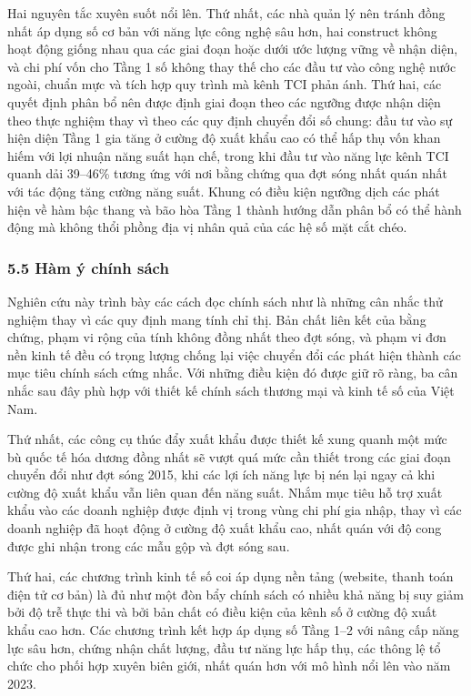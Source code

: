 \documentclass[12pt,a4paper]{article}
\begin{document}
Hai nguyên tắc xuyên suốt nổi lên. Thứ nhất, các nhà quản lý nên tránh
đồng nhất áp dụng số cơ bản với năng lực công nghệ sâu hơn, hai
construct không hoạt động giống nhau qua các giai đoạn hoặc dưới ước
lượng vững về nhận diện, và chi phí vốn cho Tầng 1 số không thay thế cho
các đầu tư vào công nghệ nước ngoài, chuẩn mực và tích hợp quy trình mà
kênh TCI phản ánh. Thứ hai, các quyết định phân bổ nên được định giai
đoạn theo các ngưỡng được nhận diện theo thực nghiệm thay vì theo các
quy định chuyển đổi số chung: đầu tư vào sự hiện diện Tầng 1 gia tăng ở
cường độ xuất khẩu cao có thể hấp thụ vốn khan hiếm với lợi nhuận năng
suất hạn chế, trong khi đầu tư vào năng lực kênh TCI quanh dải 39--46\%
tương ứng với nơi bằng chứng qua đợt sóng nhất quán nhất với tác động
tăng cường năng suất. Khung có điều kiện ngưỡng dịch các phát hiện về
hàm bậc thang và bão hòa Tầng 1 thành hướng dẫn phân bổ có thể hành động
mà không thổi phồng địa vị nhân quả của các hệ số mặt cắt chéo.

\hypertarget{55-huxe0m-uxfd-chuxednh-suxe1ch}{%
\subsubsection{5.5 Hàm ý chính
sách}\label{55-huxe0m-uxfd-chuxednh-suxe1ch}}

Nghiên cứu này trình bày các cách đọc chính sách như là những cân nhắc
thử nghiệm thay vì các quy định mang tính chỉ thị. Bản chất liên kết của
bằng chứng, phạm vi rộng của tính không đồng nhất theo đợt sóng, và phạm
vi đơn nền kinh tế đều có trọng lượng chống lại việc chuyển đổi các phát
hiện thành các mục tiêu chính sách cứng nhắc. Với những điều kiện đó
được giữ rõ ràng, ba cân nhắc sau đây phù hợp với thiết kế chính sách
thương mại và kinh tế số của Việt Nam.

Thứ nhất, các công cụ thúc đẩy xuất khẩu được thiết kế xung quanh một
mức bù quốc tế hóa dương đồng nhất sẽ vượt quá mức cần thiết trong các
giai đoạn chuyển đổi như đợt sóng 2015, khi các lợi ích năng lực bị nén
lại ngay cả khi cường độ xuất khẩu vẫn liên quan đến năng suất. Nhắm mục
tiêu hỗ trợ xuất khẩu vào các doanh nghiệp được định vị trong vùng chi
phí gia nhập, thay vì các doanh nghiệp đã hoạt động ở cường độ xuất khẩu
cao, nhất quán với độ cong được ghi nhận trong các mẫu gộp và đợt sóng
sau.

Thứ hai, các chương trình kinh tế số coi áp dụng nền tảng (website,
thanh toán điện tử cơ bản) là đủ như một đòn bẩy chính sách có nhiều khả
năng bị suy giảm bởi độ trễ thực thi và bởi bản chất có điều kiện của
kênh số ở cường độ xuất khẩu cao hơn. Các chương trình kết hợp áp dụng
số Tầng 1--2 với nâng cấp năng lực sâu hơn, chứng nhận chất lượng, đầu
tư năng lực hấp thụ, các thông lệ tổ chức cho phối hợp xuyên biên giới,
nhất quán hơn với mô hình nổi lên vào năm 2023.
\end{document}
